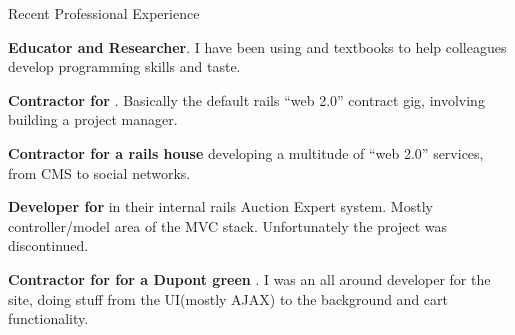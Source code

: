 \begin{rubric}{Recent Professional Experience}{


    \entry*[2009]
        \textbf{Educator and Researcher}. I have been using 
         and
        textbooks to help colleagues develop programming skills and taste.

    \entry*[2009] 
        \textbf{Contractor for
        }. Basically the
        default rails ``web 2.0'' contract gig, involving building a project
        manager.

    \entry*[2007 - 2008] 
        \textbf{Contractor for  a rails house} 
        developing a multitude of ``web 2.0'' services, from CMS to social networks.

    \entry*[2007] 
        \textbf{Developer for } 
        in their internal rails Auction Expert system. Mostly controller/model area of
        the MVC stack. Unfortunately the project was discontinued.

    \entry*[2007] 
        \textbf{Contractor for  
        for a Dupont green }.
        I was an all around developer for the site, doing stuff from the
        UI(mostly AJAX) to the background and cart functionality.


}\end{rubric}

